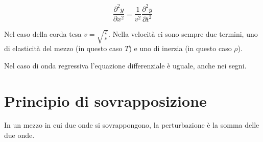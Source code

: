 \begin{equation}
   \frac{\partial^2 y}{\partial x^2}=\frac{1}{v^2}\frac{\partial^2 y}{\partial t^2}
\end{equation}

Nel caso della corda tesa $v=\sqrt{\frac{T}{\rho}}$. Nella velocità ci sono sempre due termini, uno di elasticità del mezzo (in questo caso $T$) e uno di inerzia (in questo caso $\rho$).

Nel caso di onda regressiva l'equazione differenziale è uguale, anche nei segni.
\section{Principio di sovrapposizione}
\begin{Pri}[sovrapposizione]
   In un mezzo in cui due onde si sovrappongono, la perturbazione è la somma delle due onde.
\end{Pri}
